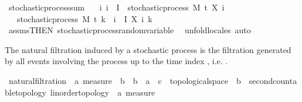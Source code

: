 \begin{isabellebody}
\endisatagproof
{\isafoldproof}%
%
\isadelimproof
%
\endisadelimproof
\isanewline
\isanewline
{}\isamarkupfalse%
\isanewline
\isanewline
{}\isamarkupfalse%
\ stochastic{\isacharunderscore}{\kern0pt}process{\isacharunderscore}{\kern0pt}sum{\isacharcolon}{\kern0pt}\isanewline
\ \ \ {\isachardoublequoteopen}{\isasymAnd}i{\isachardot}{\kern0pt}\ i\ {\isasymin}\ I\ {\isasymLongrightarrow}\ stochastic{\isacharunderscore}{\kern0pt}process\ M\ t\ {\isacharparenleft}{\kern0pt}X\ i{\isacharparenright}{\kern0pt}{\isachardoublequoteclose}\isanewline
\ \ \ {\isachardoublequoteopen}stochastic{\isacharunderscore}{\kern0pt}process\ M\ t\ {\isacharparenleft}{\kern0pt}{\isasymlambda}k\ {\isasymxi}{\isachardot}{\kern0pt}\ {\isasymSum}i\ {\isasymin}\ I{\isachardot}{\kern0pt}\ X\ i\ k\ {\isasymxi}{\isacharparenright}{\kern0pt}{\isachardoublequoteclose}%
\isadelimproof
\ %
\endisadelimproof
%
\isatagproof
{}\isamarkupfalse%
\ assms{\isacharbrackleft}{\kern0pt}THEN\ stochastic{\isacharunderscore}{\kern0pt}process{\isachardot}{\kern0pt}random{\isacharunderscore}{\kern0pt}variable{\isacharbrackright}{\kern0pt}\ \isamarkupfalse%
\ {\isacharparenleft}{\kern0pt}unfold{\isacharunderscore}{\kern0pt}locales{\isacharcomma}{\kern0pt}\ auto{\isacharparenright}{\kern0pt}%
\endisatagproof
{\isafoldproof}%
%
\isadelimproof
%
\endisadelimproof
%
\isadelimdocument
%
\endisadelimdocument
%
\isatagdocument
%
\isamarkuptrue%
%
\endisatagdocument
{\isafolddocument}%
%
\isadelimdocument
%
\endisadelimdocument
%
\begin{isamarkuptext}%
The natural filtration induced by a stochastic process  is the filtration generated by all events involving the process up to the time index , i.e. .%
\end{isamarkuptext}\isamarkuptrue%
\isamarkupfalse%
\ natural{\isacharunderscore}{\kern0pt}filtration\ {\isacharcolon}{\kern0pt}{\isacharcolon}{\kern0pt}\ {\isachardoublequoteopen}{\isacharprime}{\kern0pt}a\ measure\ {\isasymRightarrow}\ {\isacharprime}{\kern0pt}b\ {\isasymRightarrow}\ {\isacharparenleft}{\kern0pt}{\isacharprime}{\kern0pt}b\ {\isasymRightarrow}\ {\isacharprime}{\kern0pt}a\ {\isasymRightarrow}\ {\isacharprime}{\kern0pt}c\ {\isacharcolon}{\kern0pt}{\isacharcolon}{\kern0pt}\ topological{\isacharunderscore}{\kern0pt}space{\isacharparenright}{\kern0pt}\ {\isasymRightarrow}\ {\isacharprime}{\kern0pt}b\ {\isacharcolon}{\kern0pt}{\isacharcolon}{\kern0pt}\ {\isacharbraceleft}{\kern0pt}second{\isacharunderscore}{\kern0pt}countable{\isacharunderscore}{\kern0pt}topology{\isacharcomma}{\kern0pt}\ linorder{\isacharunderscore}{\kern0pt}topology{\isacharbraceright}{\kern0pt}\ {\isasymRightarrow}\ {\isacharprime}{\kern0pt}a\ measure{\isachardoublequoteclose}\ \isanewline

\end{isabellebody}
